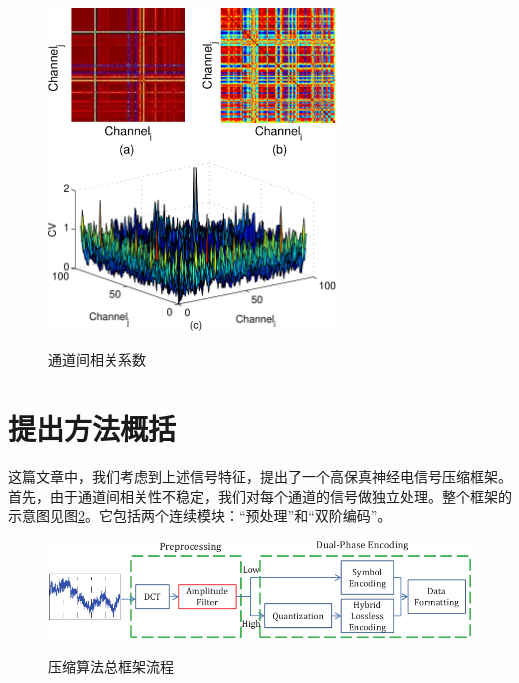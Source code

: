 \begin{enumerate}
\begin{figure}
  \centering
  \includegraphics[width=3in]{Pictures/Compression/f3(ab)-crop.pdf}\\
  \includegraphics[width=3in]{Pictures/Compression/f3(c)-crop.pdf}\\
  \caption{通道间相关系数}\label{fig:Characteristic3}
\end{figure}

\end{enumerate}



\section{提出方法概括}
这篇文章中，我们考虑到上述信号特征，提出了一个高保真神经电信号压缩框架。首先，由于通道间相关性不稳定，我们对每个通道的信号做独立处理。整个框架的示意图见图\ref{Fig:Compression Algorithm Diagram}。它包括两个连续模块：“预处理”和“双阶编码”。

\begin{figure}
  \centering
  \includegraphics{Pictures/Compression/f4test1-crop.pdf}\\
  \caption{压缩算法总框架流程}\label{Fig:Compression Algorithm Diagram}
\end{figure}

